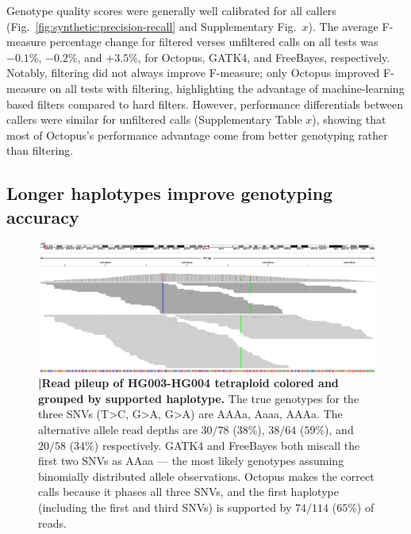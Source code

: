 \documentclass[notitlepage, twocolumn, 10pt]{article}
\begin{document}
Genotype quality scores were generally well calibrated for all callers (Fig.\ \ref{fig:synthetic:precision-recall} and Supplementary Fig.\ $x$). The average F-measure percentage change for filtered verses unfiltered calls on all tests was $-0.1\%$, $-0.2\%$, and $+3.5\%$, for Octopus, GATK4, and FreeBayes, respectively. Notably, filtering did not always improve F-measure; only Octopus improved F-measure on all tests with filtering, highlighting the advantage of machine-learning based filters compared to hard filters. However, performance differentials between callers were similar for unfiltered calls (Supplementary Table $x$), showing that most of Octopus's performance advantage come from better genotyping rather than filtering.

\subsection*{Longer haplotypes improve genotyping accuracy}

\begin{figure}[tp]
	\centering
    \includegraphics[width=\textwidth,height=0.4\textwidth]{figures/tetraploid_haplotypes.pdf}
    \caption{\textbf{|\:Read pileup of HG003-HG004 tetraploid colored and grouped by supported haplotype.} The true genotypes for the three SNVs (T>C, G>A, G>A) are AAAa, Aaaa, AAAa. The alternative allele read depths are $30/78$ ($38\%$), $38/64$ ($59\%$), and $20/58$ ($34\%$) respectively. GATK4 and FreeBayes both miscall the first two SNVs as AAaa --- the most likely genotypes assuming binomially distributed allele observations. Octopus makes the correct calls because it phases all three SNVs, and the first haplotype (including the first and third SNVs) is supported by $74/114$ ($65\%$) of reads.}
    \label{fig:tetraploid_haplotypes}
\end{figure}
\end{document}
